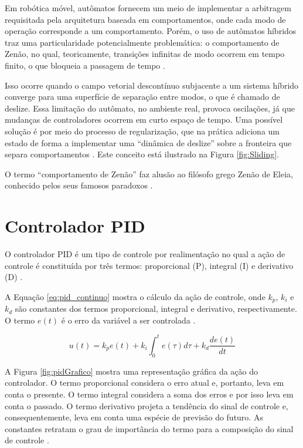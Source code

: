 Em robótica móvel, autômatos fornecem um meio de implementar a arbitragem
requisitada pela arquitetura baseada em comportamentos, onde cada modo de
operação corresponde a um comportamento. Porém, o uso de autômatos híbridos
traz uma particularidade potencialmente problemática: o comportamento de
Zenão, no qual, teoricamente, transições infinitas de modo ocorrem em tempo finito, o que
bloqueia a passagem de tempo \cite{art:Magnus_Behavior}.

Isso ocorre quando o campo vetorial descontínuo subjacente a um sistema híbrido
converge para uma superfície de separação entre modos, o que é chamado de
deslize. Essa limitação do autômato, no ambiente real, provoca oscilações, já
que mudanças de controladores ocorrem em curto espaço de tempo. Uma possível
solução é por meio do processo de regularização, que na prática adiciona um
estado de forma a implementar uma ``dinâmica de deslize'' sobre a fronteira que
separa comportamentos \cite{art:Magnus_Behavior}. Este conceito está ilustrado
na Figura \ref{fig:Sliding}.



O termo ``comportamento de Zenão'' faz alusão ao filósofo grego Zenão de
Eleia, conhecido pelos seus famosos paradoxos \cite{art:Magnus_Behavior}. 

\section{Controlador PID}

O controlador PID é um tipo de controle por realimentação no qual a ação de 
controle é constituída por três termos: proporcional (P), integral (I) e 
derivativo (D) \cite{LivroControlePID}.

A Equação \ref{eq:pid_continuo} mostra o cálculo da ação de controle, onde $k_p$, $k_i$ e $k_d$
são constantes dos termos proporcional, integral e derivativo, respectivamente. O termo $e(t)$
é o erro da variável a ser controlada \cite{LivroControlePID}.   

\begin{equation}
	\label{eq:pid_continuo}	
	u(t) = k_p e(t) + k_i \int_0^t e(\tau) d\tau + k_d \frac{de(t)}{dt}
\end{equation}

A Figura \ref{fig:pidGrafico} mostra uma representação gráfica da ação do controlador. O termo
proporcional considera o erro atual e, portanto, leva em conta o presente. O termo integral 
considera a soma dos erros e por isso leva em conta o passado. O termo derivativo projeta a tendência
do sinal de controle e, consequentemente, leva em conta uma espécie de previsão do futuro. As 
constantes retratam o grau de importância do termo para a composição do sinal de 
controle \cite{LivroControlePID}.

